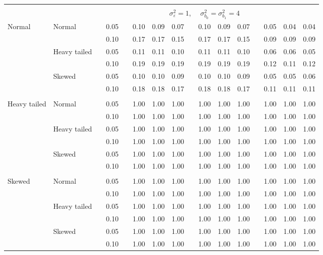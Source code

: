\begin{table}[ht]
\begin{scriptsize}
\begin{tabular}{ll p{.1cm} c p{.1cm} rrr p{.1cm} rrr p{.1cm} rrr}
&&&&&&&&&&&&&&&\\
& && && \multicolumn{9}{c}{$\sigma_{\varepsilon}^2 = 1$, \ \ $\sigma_{b_0}^2 = \sigma_{b_1}^2 = 4$} \\ \cline{6-16}

\rowcolor{gray!20} Normal       & Normal       && 0.05 &&  0.10 & 0.09 & 0.07 && 0.10 & 0.09 & 0.07 && 0.05 & 0.04 & 0.04 \\ 
\rowcolor{gray!20}             &              && 0.10 &&  0.17 & 0.17 & 0.15 && 0.17 & 0.17 & 0.15 && 0.09 & 0.09 & 0.09 \\ 
\rowcolor{gray!20}             & Heavy tailed && 0.05 &&  0.11 & 0.11 & 0.10 && 0.11 & 0.11 & 0.10 && 0.06 & 0.06 & 0.05 \\ 
\rowcolor{gray!20}             &              && 0.10 &&  0.19 & 0.19 & 0.19 && 0.19 & 0.19 & 0.19 && 0.12 & 0.11 & 0.12 \\ 
\rowcolor{gray!20}             & Skewed       && 0.05 &&  0.10 & 0.10 & 0.09 && 0.10 & 0.10 & 0.09 && 0.05 & 0.05 & 0.06 \\ 
\rowcolor{gray!20}             &              && 0.10 &&  0.18 & 0.18 & 0.17 && 0.18 & 0.18 & 0.17 && 0.11 & 0.11 & 0.11 \\ 
             &&&&&&&&&&&&&&&\\
Heavy tailed & Normal       && 0.05 &&  1.00 & 1.00 & 1.00 && 1.00 & 1.00 & 1.00 && 1.00 & 1.00 & 1.00 \\ 
             &              && 0.10 &&  1.00 & 1.00 & 1.00 && 1.00 & 1.00 & 1.00 && 1.00 & 1.00 & 1.00 \\ 
             & Heavy tailed && 0.05 &&  1.00 & 1.00 & 1.00 && 1.00 & 1.00 & 1.00 && 1.00 & 1.00 & 1.00 \\ 
             &              && 0.10 &&  1.00 & 1.00 & 1.00 && 1.00 & 1.00 & 1.00 && 1.00 & 1.00 & 1.00 \\ 
             & Skewed       && 0.05 &&  1.00 & 1.00 & 1.00 && 1.00 & 1.00 & 1.00 && 1.00 & 1.00 & 1.00 \\ 
             &              && 0.10 &&  1.00 & 1.00 & 1.00 && 1.00 & 1.00 & 1.00 && 1.00 & 1.00 & 1.00 \\ 
             &&&&&&&&&&&&&&&\\
Skewed       & Normal       && 0.05 &&  1.00 & 1.00 & 1.00 && 1.00 & 1.00 & 1.00 && 1.00 & 1.00 & 1.00 \\ 
             &              && 0.10 &&  1.00 & 1.00 & 1.00 && 1.00 & 1.00 & 1.00 && 1.00 & 1.00 & 1.00 \\ 
             & Heavy tailed && 0.05 &&  1.00 & 1.00 & 1.00 && 1.00 & 1.00 & 1.00 && 1.00 & 1.00 & 1.00 \\ 
             &              && 0.10 &&  1.00 & 1.00 & 1.00 && 1.00 & 1.00 & 1.00 && 1.00 & 1.00 & 1.00 \\ 
             & Skewed       && 0.05 &&  1.00 & 1.00 & 1.00 && 1.00 & 1.00 & 1.00 && 1.00 & 1.00 & 1.00 \\ 
             &              && 0.10 &&  1.00 & 1.00 & 1.00 && 1.00 & 1.00 & 1.00 && 1.00 & 1.00 & 1.00 \\ 



\end{tabular}
\end{scriptsize}
\end{table}
